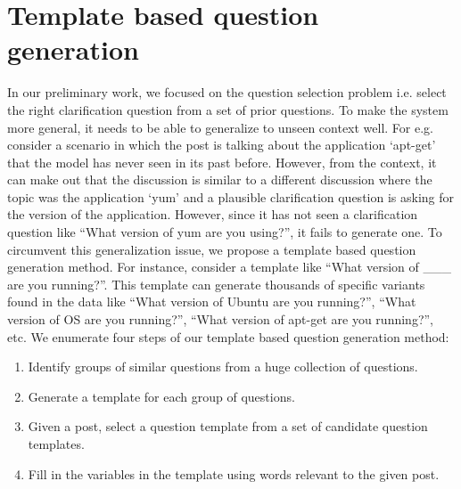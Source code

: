 \documentclass[11pt]{report}
\begin{document}
\section{Template based question generation}

In our preliminary work, we focused on the question selection problem i.e. select the right clarification question from a set of prior questions. To make the system more general, it needs to be able to generalize to unseen context well. For e.g. consider a scenario in which the post is talking about the application `apt-get' that the model has never seen in its past before. However, from the context, it can make out that the discussion is similar to a different discussion where the topic was the application `yum' and a plausible clarification question is asking for the version of the application. However, since it has not seen a clarification question like ``What version of yum are you using?'', it fails to generate one. To circumvent this generalization issue, we propose a template based question generation method. For instance, consider a template like ``What version of \_\_\_  are you running?''. This template can generate thousands of specific variants found in the data like ``What version of Ubuntu are you running?'', ``What version of OS are you running?'', ``What version of apt-get are you running?'', etc. We enumerate four steps of our template based question generation method:

\begin{enumerate}
\item Identify groups of similar questions from a huge collection of questions.
\item Generate a template for each group of questions.
\item Given a post, select a question template from a set of candidate question templates.
\item Fill in the variables in the template using words relevant to the given post.
\end{enumerate}
\end{document}
